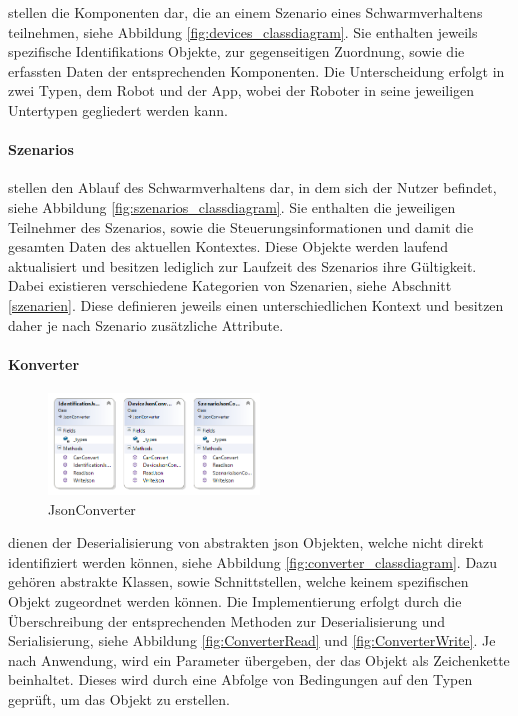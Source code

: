 stellen die Komponenten dar, die an einem Szenario eines Schwarmverhaltens teilnehmen, siehe Abbildung \eqref{fig:devices_classdiagram}. Sie enthalten jeweils spezifische Identifikations Objekte, zur gegenseitigen Zuordnung, sowie die erfassten Daten der entsprechenden Komponenten. Die Unterscheidung erfolgt in zwei Typen, dem Robot und der App, wobei der Roboter in seine jeweiligen Untertypen gegliedert werden kann. 

\paragraph{Szenarios}

stellen den Ablauf des Schwarmverhaltens dar, in dem sich der Nutzer befindet, siehe Abbildung \eqref{fig:szenarios_classdiagram}. Sie enthalten die jeweiligen Teilnehmer des Szenarios, sowie die Steuerungsinformationen und damit die gesamten Daten des aktuellen Kontextes. Diese Objekte werden laufend aktualisiert und besitzen lediglich zur Laufzeit des Szenarios ihre Gültigkeit. Dabei existieren verschiedene Kategorien von Szenarien, siehe Abschnitt \eqref{szenarien}. Diese definieren jeweils einen unterschiedlichen Kontext und besitzen daher je nach Szenario zusätzliche Attribute.

\newpage
\paragraph{Konverter}

\begin{figure}
	\begin{center}
		\includegraphics[width=0.5\textwidth]{images/uml/json_converter.png}
	\end{center}
	\caption{JsonConverter}
	\label{fig:converter_classdiagram}
\end{figure}

dienen der Deserialisierung von abstrakten \gls{json} Objekten, welche nicht direkt identifiziert werden können, siehe Abbildung \eqref{fig:converter_classdiagram}. Dazu gehören abstrakte Klassen, sowie Schnittstellen, welche keinem spezifischen Objekt zugeordnet werden können. Die Implementierung erfolgt durch die Überschreibung der entsprechenden Methoden zur Deserialisierung und Serialisierung, siehe Abbildung \eqref{fig:ConverterRead} und \eqref{fig:ConverterWrite}. Je nach Anwendung, wird ein Parameter übergeben, der das Objekt als Zeichenkette beinhaltet. Dieses wird durch eine Abfolge von Bedingungen auf den Typen geprüft, um das Objekt zu erstellen.\\

